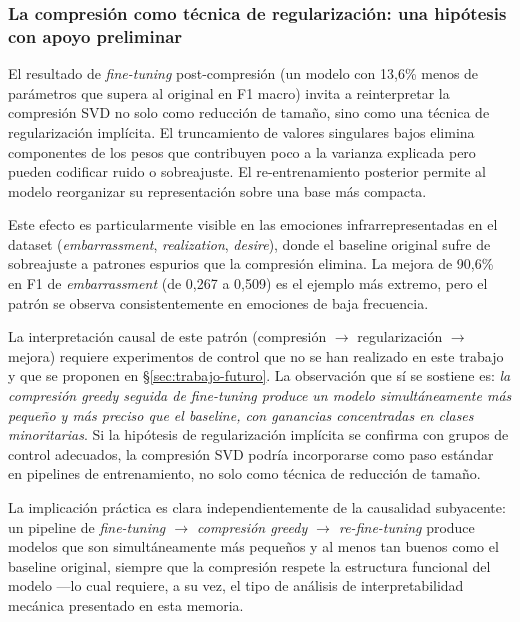 \subsubsection{La compresión como técnica de regularización: una hipótesis
con apoyo preliminar}

El resultado de \emph{fine-tuning} post-compresión (un modelo con 13{,}6\%
menos de parámetros que supera al original en F1 macro) invita a
reinterpretar la compresión SVD no solo como reducción de tamaño, sino
como una técnica de regularización implícita. El truncamiento de valores
singulares bajos elimina componentes de los pesos que contribuyen poco a
la varianza explicada pero pueden codificar ruido o sobreajuste. El
re-entrenamiento posterior permite al modelo reorganizar su
representación sobre una base más compacta.

Este efecto es particularmente visible en las emociones infrarrepresentadas
en el dataset (\emph{embarrassment}, \emph{realization}, \emph{desire}),
donde el baseline original sufre de sobreajuste a patrones espurios que la
compresión elimina. La mejora de 90{,}6\% en F1 de \emph{embarrassment}
(de 0{,}267 a 0{,}509) es el ejemplo más extremo, pero el patrón se
observa consistentemente en emociones de baja frecuencia.

La interpretación causal de este patrón (compresión $\rightarrow$
regularización $\rightarrow$ mejora) requiere experimentos de control
que no se han realizado en este trabajo y que se proponen en
\S\ref{sec:trabajo-futuro}. La observación que sí se sostiene es: \emph{la compresión greedy seguida de fine-tuning
produce un modelo simultáneamente más pequeño y más preciso que el
baseline, con ganancias concentradas en clases minoritarias}. Si la
hipótesis de regularización implícita se confirma con grupos de control
adecuados, la compresión SVD podría incorporarse como paso estándar en
pipelines de entrenamiento, no solo como técnica de reducción de tamaño.

La implicación práctica es clara independientemente de la causalidad
subyacente: un pipeline de \emph{fine-tuning $\rightarrow$ compresión
greedy $\rightarrow$ re-\emph{fine-tuning}} produce modelos que son
simultáneamente más pequeños y al menos tan buenos como el baseline
original, siempre que la compresión respete la estructura funcional del
modelo ---lo cual requiere, a su vez, el tipo de análisis de
interpretabilidad mecánica presentado en esta memoria.